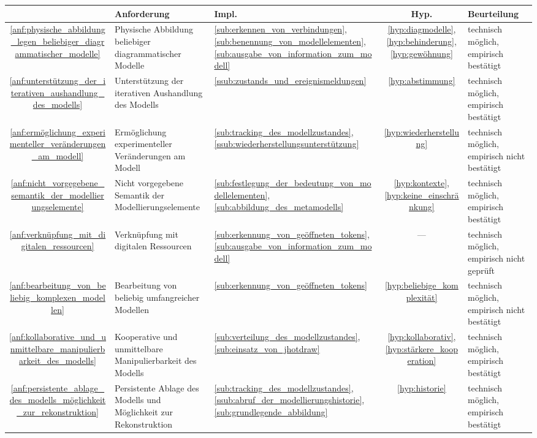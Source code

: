 \begin{center}
\begin{tabular}{| c | p{5cm} | p{1cm} | c | p{4cm} |} 
  \hline
  & Anforderung & Impl. & Hyp. & Beurteilung \\ \hline \hline
  \ref{anf:physische_abbildung_legen_beliebiger_diagrammatischer_modelle} & Physische Abbildung beliebiger diagrammatischer Modelle &  \ref{sub:erkennen_von_verbindungen}, \ref{sub:benennung_von_modellelementen}, \ref{sub:ausgabe_von_information_zum_modell} & \ref{hyp:diagmodelle}, \ref{hyp:behinderung}, \ref{hyp:gewöhnung} & technisch möglich, empirisch bestätigt \\ \hline
  \ref{anf:unterstützung_der_iterativen_aushandlung_des_modells} & Unterstützung der iterativen Aushandlung des Modells & \ref{ssub:zustands_und_ereignismeldungen} & \ref{hyp:abstimmung} & technisch möglich, empirisch bestätigt \\ \hline
  \ref{anf:ermöglichung_experimenteller_veränderungen_am_modell} & Ermöglichung experimenteller Veränderungen am Modell & \ref{sub:tracking_des_modellzustandes}, \ref{ssub:wiederherstellungsunterstützung} & \ref{hyp:wiederherstellung} & technisch möglich, empirisch nicht bestätigt \\ \hline \hline
  \ref{anf:nicht_vorgegebene_semantik_der_modellierungselemente} & Nicht vorgegebene Semantik der Modellierungselemente & \ref{sub:festlegung_der_bedeutung_von_modellelementen}, \ref{sub:abbildung_des_metamodells} & \ref{hyp:kontexte}, \ref{hyp:keine_einschränkung} & technisch möglich, empirisch bestätigt \\ \hline
  \ref{anf:verknüpfung_mit_digitalen_ressourcen} & Verknüpfung mit digitalen Ressourcen & \ref{sub:erkennung_von_geöffneten_tokens}, \ref{sub:ausgabe_von_information_zum_modell} & --- & technisch möglich, empirisch nicht geprüft \\ \hline
  \ref{anf:bearbeitung_von_beliebig_komplexen_modellen} & Bearbeitung von beliebig umfangreicher Modellen & \ref{sub:erkennung_von_geöffneten_tokens} & \ref{hyp:beliebige_komplexität} & technisch möglich, empirisch nicht bestätigt \\ \hline \hline
  \ref{anf:kollaborative_und_unmittelbare_manipulierbarkeit_des_modells} & Kooperative und unmittelbare Manipulierbarkeit des Modells & \ref{sub:verteilung_des_modellzustandes}, \ref{sub:einsatz_von_jhotdraw} & \ref{hyp:kollaborativ}, \ref{hyp:stärkere_kooperation} & technisch möglich, empirisch bestätigt \\ \hline
  \ref{anf:persistente_ablage_des_modells_möglichkeit_zur_rekonstruktion} & Persistente Ablage des Modells und Möglichkeit zur Rekonstruktion & \ref{sub:tracking_des_modellzustandes}, \ref{ssub:abruf_der_modellierungshistorie}, \ref{sub:grundlegende_abbildung} & \ref{hyp:historie} & technisch möglich, empirisch bestätigt \\ \hline 
\end{tabular}

\end{center}


